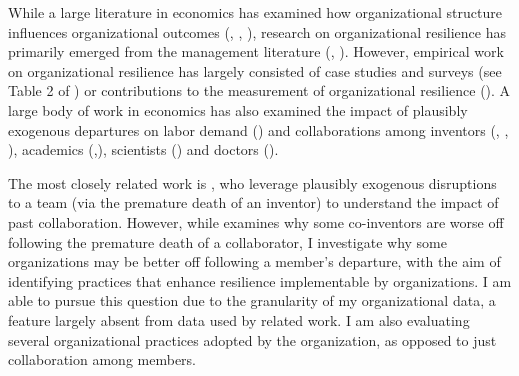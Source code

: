 \documentclass[12pt,notitlepage]{article}
\begin{document}




While a large literature in economics has examined how organizational structure influences organizational outcomes (\cite{bloom_measuring_2007}, \cite{brynjolfsson_complementarity_2012}, \cite{ichniowski_insider_2012}), research on organizational resilience has primarily emerged from the management literature (\cite{annarelli_strategic_2016}, \cite{hillmann_organizational_2021}). 
However, empirical work on organizational resilience has largely consisted of case studies and surveys (see Table 2 of \cite{annarelli_strategic_2016}) or contributions to the measurement of organizational resilience (\cite{hillmann_organizational_2021}). 
A large body of work in economics has also examined the impact of plausibly exogenous departures on labor demand (\cite{jager_how_2022}) and collaborations among inventors (\cite{agrawal_how_2008}, \cite{jaravel_team-specific_2018}, \cite{azoulay_does_2019}), academics (\cite{waldinger_quality_2010},\cite{oettl_reconceptualizing_2012}), scientists (\cite{khanna_aftermath_2021}) and doctors (\cite{chen_team-specific_2021}). 

The most closely related work is \cite{jaravel_team-specific_2018}, who leverage plausibly exogenous disruptions to a team (via the premature death of an inventor) to understand the impact of past collaboration. 
However, while \cite{jaravel_team-specific_2018} examines why some co-inventors are worse off following the premature death of a collaborator, I investigate why some organizations may be better off following a member’s departure, with the aim of identifying practices that enhance resilience implementable by organizations. 
I am able to pursue this question due to the granularity of my organizational data, a feature largely absent from data used by related work. I am also evaluating several organizational practices adopted by the organization, as opposed to just collaboration among members. 
\end{document}
